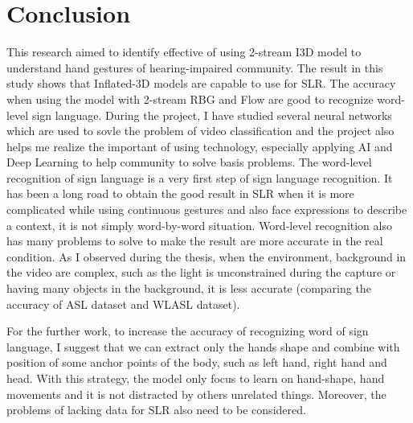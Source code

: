 \documentclass[a4paper, 12pt]{article}
\begin{document}
\section{Conclusion}
This research aimed to identify effective of using 2-stream I3D model to understand hand gestures of hearing-impaired community. The result in this study shows that Inflated-3D models are capable to use for SLR. The accuracy when using the model with 2-stream RBG and Flow are good to recognize word-level sign language.
During the project, I have studied several neural networks which are used to sovle the problem of video classification and the project also helps me realize the important of using technology, especially applying AI and Deep Learning to help community to solve basis problems.
The word-level recognition of sign language is a very first step of sign language recognition. It has been a long road to obtain the good result in SLR when it is more complicated while using continuous gestures and also face expressions to describe a context, it is not simply word-by-word situation.
Word-level recognition also has many problems to solve to make the result are more accurate in the real condition. As I observed during the thesis, when the environment, background in the video are complex, such as the light is unconstrained during the capture or having many objects in the background, it is less accurate (comparing the accuracy of ASL dataset and WLASL dataset). 

For the further work, to increase the accuracy of recognizing word of sign language, I suggest that we can extract only the hands shape and combine with position of some anchor points of the body, such as left hand, right hand and head. With this strategy, the model only focus to learn on hand-shape, hand movements and it is not distracted by others unrelated things. Moreover, the problems of lacking data for SLR also need to be considered.

\newpage

\newpage


\end{document}
